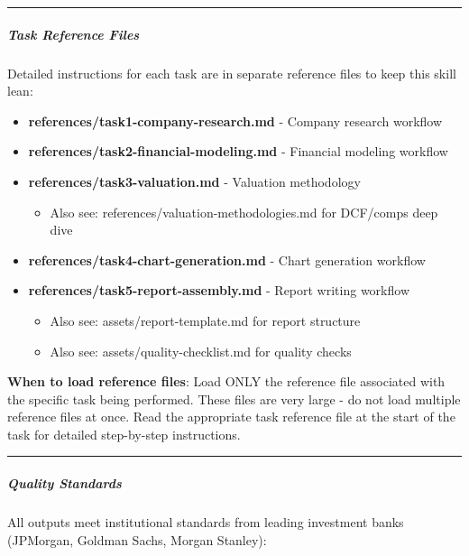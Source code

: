 \documentclass[11pt]{article}
\begin{document}
\vspace{0.5em}\hrule\vspace{0.5em}

\subparagraph{Task Reference Files}\mbox{}\par

Detailed instructions for each task are in separate reference files to keep this skill lean:


\begin{itemize}[leftmargin=*,itemsep=2pt,topsep=2pt]
\item {} \textbf{references/task1-company-research.md} - Company research workflow
\item {} \textbf{references/task2-financial-modeling.md} - Financial modeling workflow
\item {} \textbf{references/task3-valuation.md} - Valuation methodology
\begin{itemize}[leftmargin=*,itemsep=2pt,topsep=2pt]
\item {} Also see: references/valuation-methodologies.md for DCF/comps deep dive
\end{itemize}
\item {} \textbf{references/task4-chart-generation.md} - Chart generation workflow
\item {} \textbf{references/task5-report-assembly.md} - Report writing workflow
\begin{itemize}[leftmargin=*,itemsep=2pt,topsep=2pt]
\item {} Also see: assets/report-template.md for report structure
\item {} Also see: assets/quality-checklist.md for quality checks
\end{itemize}
\end{itemize}

\textbf{When to load reference files}: Load ONLY the reference file associated with the specific task being performed. These files are very large - do not load multiple reference files at once. Read the appropriate task reference file at the start of the task for detailed step-by-step instructions.


\vspace{0.5em}\hrule\vspace{0.5em}

\subparagraph{Quality Standards}\mbox{}\par

All outputs meet institutional standards from leading investment banks (JPMorgan, Goldman Sachs, Morgan Stanley):
\end{document}
